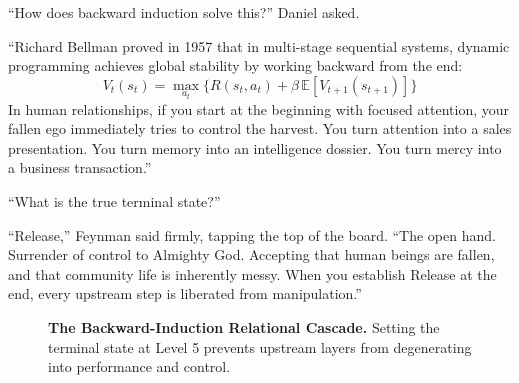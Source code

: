 \documentclass[11pt]{report}
\begin{document}
``How does backward induction solve this?'' Daniel asked.

``Richard Bellman proved in 1957 that in multi-stage sequential systems, dynamic programming achieves global stability by working backward from the end:
\begin{equation}
V_t(s_t) = \max_{a_t} \Big\{ R(s_t, a_t) + \beta \, \mathbb{E}[V_{t+1}(s_{t+1})] \Big\}
\end{equation}
In human relationships, if you start at the beginning with focused attention, your fallen ego immediately tries to control the harvest. You turn attention into a sales presentation. You turn memory into an intelligence dossier. You turn mercy into a business transaction.''

``What is the true terminal state?''

``Release,'' Feynman said firmly, tapping the top of the board. ``The open hand. Surrender of control to Almighty God. Accepting that human beings are fallen, and that community life is inherently messy. When you establish Release at the end, every upstream step is liberated from manipulation.''

\begin{figure}[H]
\centering
{}
\caption{\textbf{The Backward-Induction Relational Cascade.} Setting the terminal state at Level 5 prevents upstream layers from degenerating into performance and control.}
\label{fig:cascade}
\end{figure}
\end{document}

